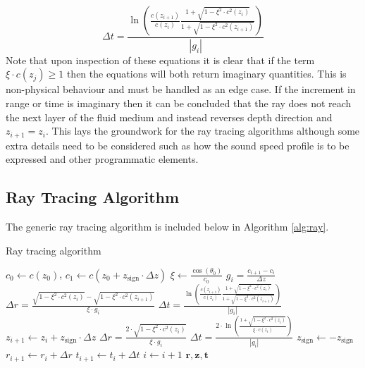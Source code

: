 \documentclass{article}
\begin{document}
\begin{equation}
	\label{eq:dt}
	\Delta t = \frac{\ln{\left( \frac{c(z_{i+1})}{c(z_i)}\frac{1 + \sqrt{1 - \xi^2\cdot c^2(z_i)}}{1 + \sqrt{1 - \xi^2\cdot c^2(z_{i+1})}} \right)}}{|g_i|}
\end{equation}
Note that upon inspection of these equations it is clear that if the term $\xi\cdot c(z_{j})\geq 1$ then the equations will both return imaginary quantities. This is non-physical behaviour and must be handled as an edge case. If the increment in range or time is imaginary then it can be concluded that the ray does not reach the next layer of the fluid medium and instead reverses depth direction and $z_{i+1}=z_i$. This lays the groundwork for the ray tracing algorithms although some extra details need to be considered such as how the sound speed profile is to be expressed and other programmatic elements.

\subsection{Ray Tracing Algorithm}
The generic ray tracing algorithm is included below in Algorithm \ref{alg:ray}.
\begin{algorithm}
	\caption{Ray tracing algorithm}\label{alg:ray}
	\begin{algorithmic}
		\State $c_0\gets c(z_0)$, $c_1\gets c(z_0+z_{\mathrm{sign}}\cdot\Delta z)$
		\State $\xi\gets \frac{\cos(\theta_0)}{c_0}$
		\State $g_i=\frac{c_{i+1} - c_i}{\Delta z}$
		\State $\Delta r = \frac{\sqrt{1-\xi^2\cdot c^2(z_i)} - \sqrt{1-\xi^2\cdot c^2(z_{i+1})}}{\xi\cdot g_i}$
		\State $\Delta t = \frac{\ln{\left( \frac{c(z_{i+1})}{c(z_i)}\frac{1 + \sqrt{1 - \xi^2\cdot c^2(z_i)}}{1 + \sqrt{1 - \xi^2\cdot c^2(z_{i+1})}} \right)}}{|g_i|}$
		\State $z_{i+1}\gets z_i+z_{\mathrm{sign}}\cdot\Delta z$
		\Else
		\State $\Delta r=\frac{2\cdot\sqrt{1-\xi^2\cdot c^2(z_i)}}{\xi\cdot g_i}$
		\State $\Delta t=\frac{2\cdot\ln{(\frac{1 + \sqrt{1-\xi^2\cdot c^2(z_i)}}{\xi\cdot c(z_i)})}}{|g_i|}$
		\State $z_{\mathrm{sign}}\gets-z_{\mathrm{sign}}$
		\EndIf
		\State $r_{i+1} \gets r_i + \Delta r$
		\State $t_{i+1}\gets t_i+\Delta t$
		\State $i\gets i+1$
		\EndWhile
		\Return $\bm{r}, \bm{z}, \bm{t}$
	\end{algorithmic}
\end{algorithm}
\end{document}
